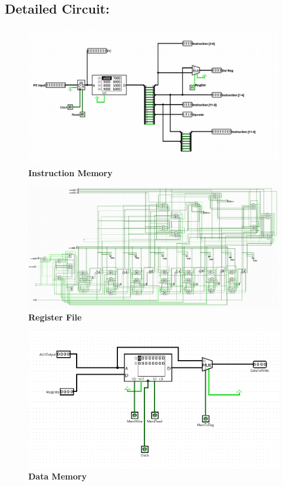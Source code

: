 \documentclass[12]{article}
\begin{document}
\subsection{Detailed Circuit: }
    \begin{figure}[!h]
        \centering
        \includegraphics[scale = 0.45]{Images/Instruction Memory.png}
        \caption{\textbf{Instruction Memory}}
    \end{figure}

\begin{figure}[t]
    \centering
    \includegraphics[scale = 0.4]{Images/Register File.png}
    \caption{\textbf{Register File}}
\end{figure}

\begin{figure}[!h]
    \centering
    \includegraphics[scale = 0.75]{Images/Data Memory.png}
    \caption{\textbf{Data Memory}}
\end{figure}
\end{document}
